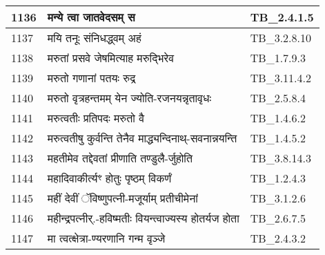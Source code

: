 \documentclass[17pt]{extarticle}
\begin{document}
\begin{longtable}{||p{0.4in}||p{4.9in}||p{0.9in}||}
    \hline
        
    1136 & मन्ये त्वा जातवेदसम् स & TB\_2.4.1.5       \\
    
    \hline
        
    1137 & मयि तनूः संनिधद्ध्वम् अहं & TB\_3.2.8.10       \\
    
    \hline
        
    1138 & मरुतां प्रसवे जेषमित्याह मरुद्भिरेव & TB\_1.7.9.3       \\
    
    \hline
        
    1139 & मरुतो गणानां पतयः रुद्र & TB\_3.11.4.2       \\
    
    \hline
        
    1140 & मरुतो वृत्रहन्तमम् येन ज्योति{-}रजनयन्नृतावृधः & TB\_2.5.8.4       \\
    
    \hline
        
    1141 & मरुत्वतीः प्रतिपदः मरुतो वै & TB\_1.4.6.2       \\
    
    \hline
        
    1142 & मरुत्वतीषु कुर्वन्ति तेनैव माद्ध्यन्दिनाथ्{-}सवनान्नयन्ति & TB\_1.4.5.2       \\
    
    \hline
        
    1143 & महतीमेव तद्देवतां प्रीणाति तण्डुलै{-}र्जुहोति & TB\_3.8.14.3       \\
    
    \hline
        
    1144 & महादिवाकीर्त्यꣳ होतुः पृष्ठम् विकर्णं & TB\_1.2.4.3       \\
    
    \hline
        
    1145 & महीं देवीं ॅविष्णुपत्नी{-}मजूर्याम् प्रतीचीमेनां & TB\_3.1.2.6       \\
    
    \hline
        
    1146 & महीन्द्रपत्नीर्.{-}हविष्मतीः वियन्त्वाज्यस्य होतर्यज होता & TB\_2.6.7.5       \\
    
    \hline
        
    1147 & मा त्वत्क्षेत्रा{-}ण्यरणानि गन्म वृञ्जे & TB\_2.4.3.2       \\
    

\end{longtable}
\end{document}
